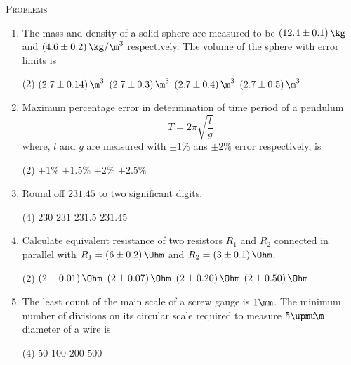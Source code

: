 \documentclass{article}
\renewcommand{\ans}{\quad}
\begin{document}
\begin{center}
    \textsc{Problems}
\end{center}
\begin{enumerate}
    \item The mass and density of a solid sphere are measured to be $\left(12.4\pm 0.1\right)\kg$ and $\left(4.6\pm 0.2\right)\kg/\m^3$ respectively. The volume of the sphere with error limits is
    \begin{tasks}(2)
        \task $\left(2.7\pm 0.14\right)\m^3$\ans
        \task $\left(2.7\pm 0.3\right)\m^3$
        \task $\left(2.7\pm 0.4\right)\m^3$
        \task $\left(2.7\pm 0.5\right)\m^3$
    \end{tasks}

    \item Maximum percentage error in determination of time period of a pendulum \[ T=2\pi\sqrt{\dfrac{l}{g}} \] where, $l$ and $g$ are measured with $\pm 1\%$ ans $\pm 2\%$ error respectively, is
    \begin{tasks}(2)
        \task $\pm 1\%$
        \task $\pm 1.5\%$\ans
        \task $\pm 2\%$
        \task $\pm 2.5\%$
    \end{tasks}

    \item Round off $231.45$ to two significant digits.
    \begin{tasks}(4)
        \task $230$\ans
        \task $231$
        \task $231.5$
        \task $231.45$
    \end{tasks}

    \item Calculate equivalent resistance of two resistors $R_1$ and $R_2$ connected in parallel with $R_1=\left(6\pm 0.2\right)\Ohm$ and $R_2=\left(3\pm 0.1\right)\Ohm$. 
    \begin{tasks}(2)
        \task $\left(2\pm 0.01\right)\Ohm$
        \task $\left(2\pm 0.07\right)\Ohm$\ans
        \task $\left(2\pm 0.20\right)\Ohm$
        \task $\left(2\pm 0.50\right)\Ohm$
    \end{tasks}

    \item The least count of the main scale of a screw gauge is $1 \mm$. The minimum number of divisions on its circular scale required to measure $5 \upmu\!\m$ diameter of a wire is
    \begin{tasks}(4)
        \task $50$
        \task $100$
        \task $200$\ans
        \task $500$
    \end{tasks}


\end{enumerate}
\end{document}
